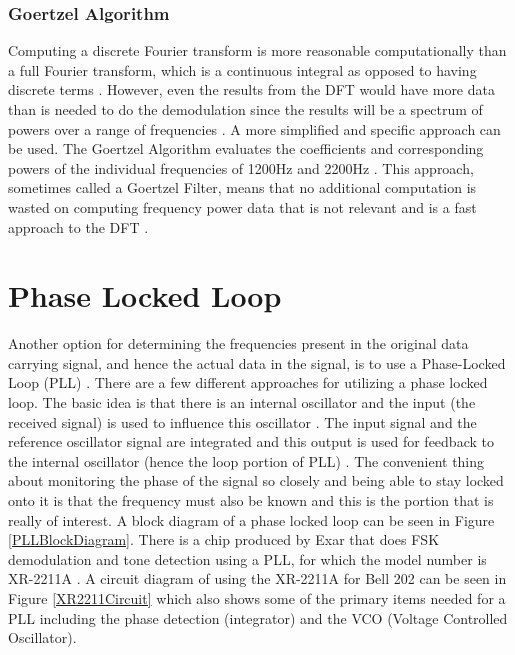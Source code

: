 \subsubsection{Goertzel Algorithm}
Computing a discrete Fourier transform is more reasonable computationally than a full Fourier transform, which is a continuous integral as opposed to having discrete terms \cite{WikipediaFT}. However, even the results from the DFT would have more data than is needed to do the demodulation since the results will be a spectrum of powers over a range of frequencies \cite{WikipediaDFT,WikipediaFFT}. A more simplified and specific approach can be used. The Goertzel Algorithm evaluates the coefficients and corresponding powers of the individual frequencies of 1200Hz and 2200Hz \cite{WikipediaGA,Elmenreich2011}. This approach, sometimes called a Goertzel Filter, means that no additional computation is wasted on computing frequency power data that is not relevant and is a fast approach to the DFT \cite{SanjitK1993}.

\section{Phase Locked Loop}
Another option for determining the frequencies present in the original data carrying signal, and hence the actual data in the signal, is to use a Phase-Locked Loop (PLL) \cite{Akoum,Perrott2009,Lutus2011}. There are a few different approaches for utilizing a phase locked loop. The basic idea is that there is an internal oscillator and the input (the received signal) is used to influence this oscillator \cite{Gaeddert2013} . The input signal and the reference oscillator signal are integrated and this output is used for feedback to the internal oscillator (hence the loop portion of PLL) \cite{Roppel}. The convenient thing about monitoring the phase of the signal so closely and being able to stay locked onto it is that the frequency must also be known and this is the portion that is really of interest. A block diagram of a phase locked loop can be seen in Figure \ref{PLLBlockDiagram}. There is a chip produced by Exar that does FSK demodulation and tone detection using a PLL, for which the model number is XR-2211A \cite{EXAR1997}. A circuit diagram of using the XR-2211A for Bell 202 can be seen in Figure \ref{XR2211Circuit} which also shows some of the primary items needed for a PLL including the phase detection (integrator) and the VCO (Voltage Controlled Oscillator).

